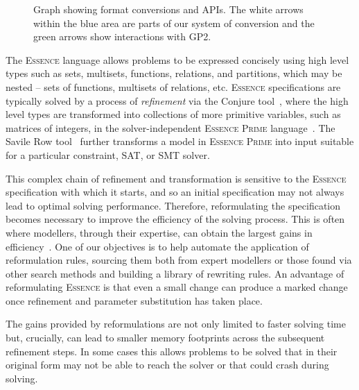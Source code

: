 \documentclass[a4paper,UKenglish,cleveref,pdfa]{lipics-v2021}
\newcommand{\essence}{\textsc{Essence}\xspace}
\newcommand{\eprime}{\textsc{Essence Prime}\xspace}
\newcommand{\conjure}{\textsc{Conjure}\xspace}
\newcommand{\savilerow}{\textsc{Savile Row}\xspace}
\begin{document}
\begin{figure}[htbp]
\centering
\vspace{-10pt}

  \caption{Graph showing format conversions and APIs. The white arrows within the blue area are parts of our system of conversion and the green arrows show interactions with GP2.}
  \label{fig:formats_graph}
\end{figure}

The \essence language allows problems to be expressed concisely using high level types such as sets, multisets, functions, relations, and partitions, which may be nested -- sets of functions, multisets of relations, etc. \essence specifications are typically solved by a process of {\em refinement} via the {\sc Conjure} tool~\cite{Akgun2022:Conjure}, where the high level types are transformed into collections of more primitive variables, such as matrices of integers, in the solver-independent \eprime language~\cite{nightingale2016essence}. The {\sc Savile Row} tool~\cite{savilerow} further transforms a model in \eprime into input suitable for a particular constraint, SAT, or SMT solver.

This complex chain of refinement and transformation is sensitive to the \essence specification with which it starts, and so an  initial specification may not always lead to optimal solving performance. Therefore, reformulating the specification becomes necessary to improve the efficiency of the solving process. This is often where modellers, through their expertise, can obtain the largest gains in efficiency~\cite{Regin2013:ACP}. One of our objectives is to help automate the application of reformulation rules, sourcing them both from expert modellers or those found via other search methods and building a library of rewriting rules. An advantage of reformulating \essence is that even a small change can produce a marked change once refinement and parameter substitution has taken place.


The gains provided by reformulations are not only limited to faster solving time but, crucially, can lead to smaller memory footprints across the subsequent refinement steps. In some cases this allows problems to be solved that in their original form may not be able to reach the solver or that could crash during solving.
\end{document}
